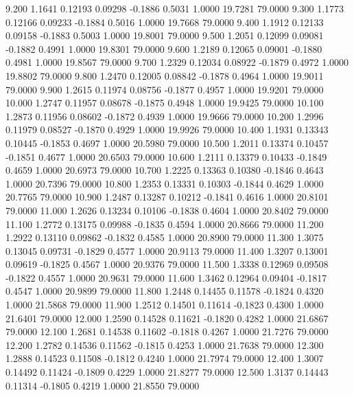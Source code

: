    9.200   1.1641   0.12193   0.09298  -0.1886   0.5031   1.0000  19.7281  79.0000
   9.300   1.1773   0.12166   0.09233  -0.1884   0.5016   1.0000  19.7668  79.0000
   9.400   1.1912   0.12133   0.09158  -0.1883   0.5003   1.0000  19.8001  79.0000
   9.500   1.2051   0.12099   0.09081  -0.1882   0.4991   1.0000  19.8301  79.0000
   9.600   1.2189   0.12065   0.09001  -0.1880   0.4981   1.0000  19.8567  79.0000
   9.700   1.2329   0.12034   0.08922  -0.1879   0.4972   1.0000  19.8802  79.0000
   9.800   1.2470   0.12005   0.08842  -0.1878   0.4964   1.0000  19.9011  79.0000
   9.900   1.2615   0.11974   0.08756  -0.1877   0.4957   1.0000  19.9201  79.0000
  10.000   1.2747   0.11957   0.08678  -0.1875   0.4948   1.0000  19.9425  79.0000
  10.100   1.2873   0.11956   0.08602  -0.1872   0.4939   1.0000  19.9666  79.0000
  10.200   1.2996   0.11979   0.08527  -0.1870   0.4929   1.0000  19.9926  79.0000
  10.400   1.1931   0.13343   0.10445  -0.1853   0.4697   1.0000  20.5980  79.0000
  10.500   1.2011   0.13374   0.10457  -0.1851   0.4677   1.0000  20.6503  79.0000
  10.600   1.2111   0.13379   0.10433  -0.1849   0.4659   1.0000  20.6973  79.0000
  10.700   1.2225   0.13363   0.10380  -0.1846   0.4643   1.0000  20.7396  79.0000
  10.800   1.2353   0.13331   0.10303  -0.1844   0.4629   1.0000  20.7765  79.0000
  10.900   1.2487   0.13287   0.10212  -0.1841   0.4616   1.0000  20.8101  79.0000
  11.000   1.2626   0.13234   0.10106  -0.1838   0.4604   1.0000  20.8402  79.0000
  11.100   1.2772   0.13175   0.09988  -0.1835   0.4594   1.0000  20.8666  79.0000
  11.200   1.2922   0.13110   0.09862  -0.1832   0.4585   1.0000  20.8900  79.0000
  11.300   1.3075   0.13045   0.09731  -0.1829   0.4577   1.0000  20.9113  79.0000
  11.400   1.3207   0.13001   0.09619  -0.1825   0.4567   1.0000  20.9376  79.0000
  11.500   1.3338   0.12969   0.09508  -0.1822   0.4557   1.0000  20.9631  79.0000
  11.600   1.3462   0.12964   0.09404  -0.1817   0.4547   1.0000  20.9899  79.0000
  11.800   1.2448   0.14455   0.11578  -0.1824   0.4320   1.0000  21.5868  79.0000
  11.900   1.2512   0.14501   0.11614  -0.1823   0.4300   1.0000  21.6401  79.0000
  12.000   1.2590   0.14528   0.11621  -0.1820   0.4282   1.0000  21.6867  79.0000
  12.100   1.2681   0.14538   0.11602  -0.1818   0.4267   1.0000  21.7276  79.0000
  12.200   1.2782   0.14536   0.11562  -0.1815   0.4253   1.0000  21.7638  79.0000
  12.300   1.2888   0.14523   0.11508  -0.1812   0.4240   1.0000  21.7974  79.0000
  12.400   1.3007   0.14492   0.11424  -0.1809   0.4229   1.0000  21.8277  79.0000
  12.500   1.3137   0.14443   0.11314  -0.1805   0.4219   1.0000  21.8550  79.0000
